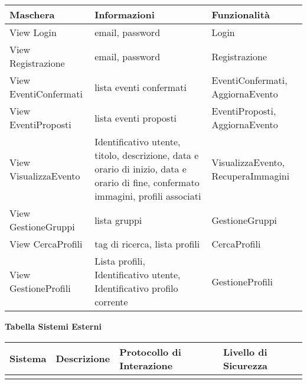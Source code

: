 \begin{tabular} {|P{4.5cm}|P{6.5cm}|P{4cm}|}
    \hline
    \textbf{Maschera}     & \textbf{Informazioni}                                                                                                              & \textbf{Funzionalità}              \\
    \hline
    View Login            & email, password                                                                                                                    & Login                              \\
    \hline
    View Registrazione    & email, password                                                                                                                    & Registrazione                      \\
    \hline
    View EventiConfermati & lista eventi confermati                                                                                                            & EventiConfermati, AggiornaEvento   \\
    \hline
    View EventiProposti   & lista eventi proposti                                                                                                              & EventiProposti, AggiornaEvento     \\
    \hline
    View VisualizzaEvento & Identificativo utente, titolo, descrizione, data e orario di inizio, data e orario di fine, confermato immagini, profili associati & VisualizzaEvento, RecuperaImmagini \\
    \hline
    View GestioneGruppi   & lista gruppi                                                                                                                       & GestioneGruppi                     \\
    \hline
    View CercaProfili     & tag di ricerca, lista profili                                                                                                      & CercaProfili                       \\
    \hline
    View GestioneProfili  & Lista profili, Identificativo utente, Identificativo profilo corrente                                                              & GestioneProfili                    \\
    \hline
\end{tabular}
\hfill \break

\textbf{Tabella Sistemi Esterni}
\hfill \break

\begin{tabular} {|P{2.5cm}|P{3cm}|P{4.5cm}|P{4.5cm}|}
    \hline
    \textbf{Sistema} & \textbf{Descrizione} & \textbf{Protocollo di Interazione} & \textbf{Livello di Sicurezza} \\
    \hline
                     &                      &                                    &                               \\
    \hline
\end{tabular}
\hfill \break


